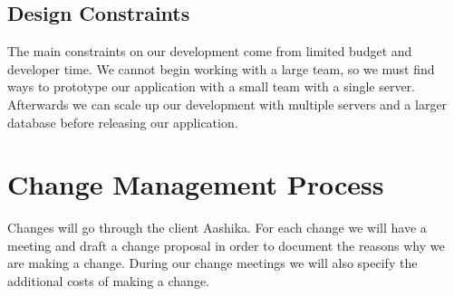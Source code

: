 \documentclass[12pt]{article}
\begin{document}
\subsection{Design Constraints}

The main constraints on our development come from limited budget and developer time. We cannot begin working with a large team, so we must find
ways to prototype our application with a small team with a single server. Afterwards we can scale up our development with multiple servers
and a larger database before releasing our application.

\section{Change Management Process}

Changes will go through the client Aashika. For each change we will have a meeting and
draft a change proposal in order to document the reasons why we are making a change. During
our change meetings we will also specify the additional costs of making a change.
\end{document}
